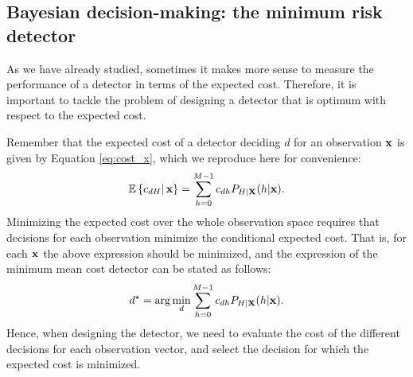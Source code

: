 \subsection{Bayesian decision-making: the minimum risk detector}

As we have already studied, sometimes it makes more sense to measure the performance of a detector in terms of the expected cost. Therefore, it is important to tackle the problem of designing a detector that is optimum with respect to the expected cost.

Remember that the expected cost of a detector deciding $d$ for an observation ${\bf x}$ is given by Equation \eqref{eq:cost_x}, which we reproduce here for convenience:
\begin{equation}
   \mathbb{E}\left\{ c_{dH}\right|{\bf x}\} = \sum_{h=0}^{M-1} c_{dh} P_{H|\bf X}(h|{\bf x}) \label{eq:mean_x_2}.
\end{equation}
Minimizing the expected cost over the whole observation space requires that decisions for each observation minimize the conditional expected cost. That is, for each ${\bf x}$ the above expression should be minimized, and the expression of the minimum mean cost detector can be stated as follows:
$$d^\star = \arg\min_{d} \sum_{h=0}^{M-1} c_{dh} P_{H|\bf X}(h|{\bf x}).$$
Hence, when designing the detector, we need to evaluate the cost of the different decisions for each observation vector, and select the decision for which the expected cost is minimized.


